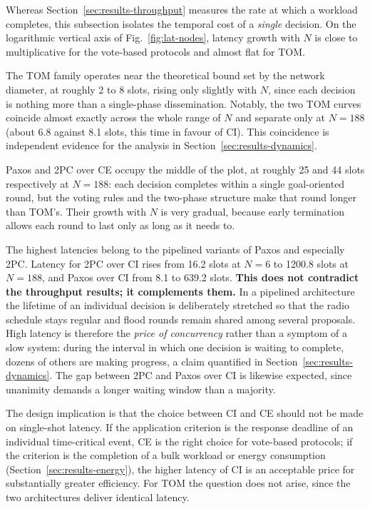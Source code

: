\documentclass[journal]{IEEEtran}
\newcommand{\CI}{CI}                      %
\newcommand{\CE}{CE}                      %
\newcommand{\Nnodes}{N}                   %
\begin{document}
Whereas Section~\ref{sec:results-throughput} measures the rate at which a
workload completes, this subsection isolates the temporal cost of a
\emph{single} decision. On the logarithmic vertical axis of
Fig.~\ref{fig:lat-nodes}, latency growth with $\Nnodes$ is close to
multiplicative for the vote-based protocols and almost flat for TOM.

The TOM family operates near the theoretical bound set by the network
diameter, at roughly 2 to 8 slots, rising only slightly with $\Nnodes$,
since each decision is nothing more than a single-phase dissemination.
Notably, the two TOM curves coincide almost exactly across the whole
range of $\Nnodes$ and separate only at $\Nnodes = 188$ (about 6.8
against 8.1 slots, this time in favour of \CI). This coincidence is
independent evidence for the analysis in
Section~\ref{sec:results-dynamics}.

Paxos and 2PC over \CE{} occupy the middle of the plot, at roughly 25 and
44 slots respectively at $\Nnodes = 188$: each decision completes within
a single goal-oriented round, but the voting rules and the two-phase
structure make that round longer than TOM's. Their growth with $\Nnodes$
is very gradual, because early termination allows each round to last only
as long as it needs to.

The highest latencies belong to the pipelined variants of Paxos and
especially 2PC. Latency for 2PC over \CI{} rises from 16.2 slots at
$\Nnodes = 6$ to 1200.8 slots at $\Nnodes = 188$, and Paxos over
\CI{} from 8.1 to 639.2 slots. \textbf{This does not contradict
the throughput results; it complements them.} In a pipelined
architecture the lifetime of an individual decision is deliberately
stretched so that the radio schedule stays regular and flood rounds
remain shared among several proposals. High latency is therefore the
\emph{price of concurrency} rather than a symptom of a slow system:
during the interval in which one decision is waiting to complete, dozens
of others are making progress, a claim quantified in
Section~\ref{sec:results-dynamics}. The gap between 2PC and Paxos over
\CI{} is likewise expected, since unanimity demands a longer waiting
window than a majority.

The design implication is that the choice between \CI{} and \CE{} should
not be made on single-shot latency. If the application criterion is the
response deadline of an individual time-critical event, \CE{} is the
right choice for vote-based protocols; if the criterion is the completion
of a bulk workload or energy consumption
(Section~\ref{sec:results-energy}), the higher latency of \CI{} is an
acceptable price for substantially greater efficiency. For TOM the
question does not arise, since the two architectures deliver identical
latency.
\end{document}
